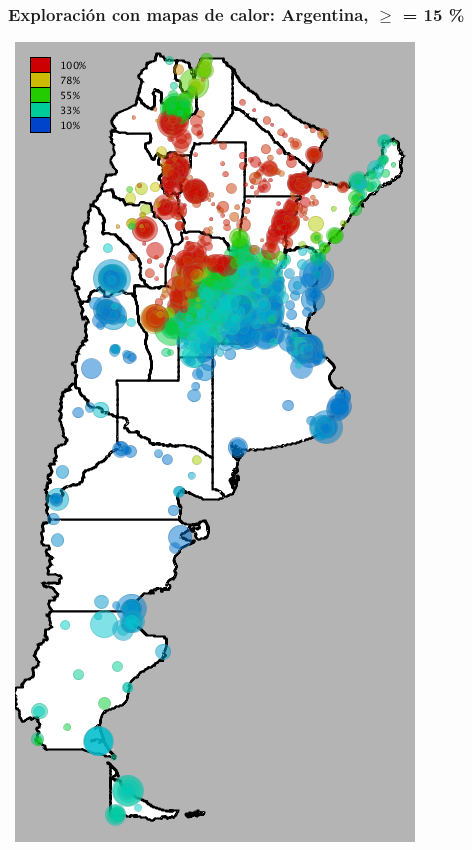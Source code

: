 \documentclass[xcolor=x11names]{beamer}
\begin{document}
\begin{frame}
	\frametitle{Exploración con mapas de calor: Argentina, $\geq$ = 15 \%}
	\center\
	\includegraphics[height=.9\textheight,width = .9\columnwidth, keepaspectratio]
	{slides/201112_hi_res_argentina_usuarios_proporcion_circulos_beta15.png}
\end{frame}
\end{document}
